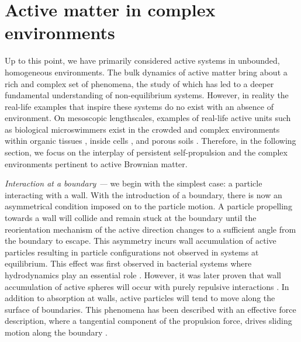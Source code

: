 \section{Active matter in complex environments}
\label{section:activeMatter:confinement}

Up to this point, we have primarily considered active systems in unbounded, homogeneous environments. The bulk dynamics of active matter bring about a rich and complex set of phenomena, the study of which has led to a deeper fundamental understanding of non-equilibrium systems. However, in reality the real-life examples that inspire these systems do no exist with an absence of environment. On mesoscopic lengthscales, examples of real-life active units such as biological microswimmers exist in the crowded and complex environments within 
organic tissues \cite{hutmacher2000}, inside cells \cite{isermann2017}, and porous soils \cite{gannon1991}.
Therefore, in the following section, we focus on the interplay of persistent self-propulsion and the complex environments pertinent to active Brownian matter.

\textit{Interaction at a boundary ---} we begin with the simplest case: a particle interacting with a wall. With the introduction of a boundary, there is now an asymmetrical condition imposed on to the particle motion. A particle propelling towards a wall will collide and remain stuck at the boundary until the reorientation mechanism of the active direction changes to a sufficient angle from the boundary to escape. This asymmetry incurs wall accumulation of active particles resulting in particle configurations not observed in systems at equilibrium. This effect was first observed in bacterial systems where hydrodynamics play an essential role \cite{berke2008}. However, it was later proven that wall accumulation of active spheres will occur with purely repulsive interactions \cite{elgeti2013}.  
In addition to absorption at walls, active particles will tend to move along the surface of boundaries. This phenomena has been described with an effective force description, where a tangential component of the propulsion force, drives sliding motion along the boundary \cite{vanteeffelen2008}.

